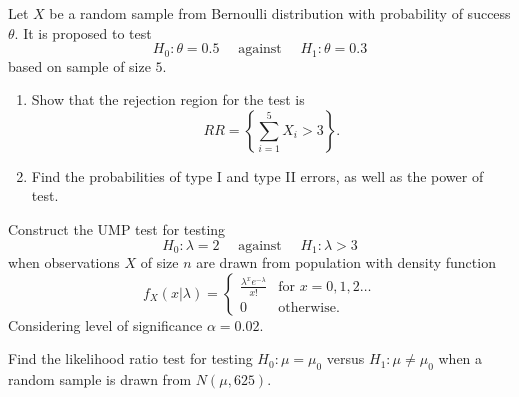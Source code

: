 \begin{mdframed}
    \begin{Exercise}
        Let $X$ be a random sample from Bernoulli distribution 
        with probability of success $\theta$. It is proposed to test
        \[
            H_0 : \theta = 0.5 \quad \text{ against } \quad H_1 : \theta = 0.3
        \]
        based on sample of size $5$.
        \begin{enumerate}
            \item Show that the rejection region for the test is 
            \[
                RR = \left\{ \sum_{i=1}^{5} X_i > 3 \right\}.
            \]
            \item Find the probabilities of type I and type II errors, as well as the power of test.
        \end{enumerate}
    \end{Exercise}

    \begin{Exercise}
        Construct the UMP test for testing 
        \[
            H_0 : \lambda = 2 \quad \text{ against } \quad H_1 : \lambda > 3
        \]
        when observations $X$ of size $n$ are drawn from population with density function
        \[
            f_X(x|\lambda) = \begin{cases}
                \displaystyle \frac{\lambda^x e^{-\lambda}}{x!} & \text{for } x = 0,1,2\ldots \\
                0 & \text{otherwise}.
            \end{cases}
        \]
        Considering level of significance $\alpha = 0.02$.
    \end{Exercise}

    \begin{Exercise}
        Find the likelihood ratio test for testing $H_0:\mu = \mu_0$ versus 
        $H_1:\mu \neq \mu_0$ when a random sample is drawn from 
        $N(\mu, 625)$.
    \end{Exercise}
\end{mdframed}